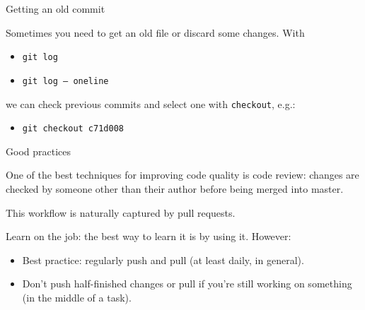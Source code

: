 \documentclass{beamer}
\begin{document}
\begin{frame}{Getting an old commit}

Sometimes you need to get an old file or discard some changes. With 

\begin{itemize}
 \item \texttt{git log} 
 \item \texttt{git log -- oneline}
\end{itemize}

we can check previous commits and select one with \texttt{checkout}, e.g.:
\begin{itemize}
 \item \texttt{git checkout c71d008}
\end{itemize}

\end{frame}


\begin{frame}{Good practices}

One of the best techniques for improving code quality is code
review: changes are checked by someone other than their
author before being merged into master. 

This workflow is naturally captured by pull requests.

Learn on the job: the best way to learn it is by using it. However:
\begin{itemize}
  \item Best practice: regularly push and pull (at least daily, in general).
  \item Don't push half-finished changes or pull if you're still working on something (in the middle of a task).
\end{itemize}


\end{frame}



% 
% 


\end{document}
